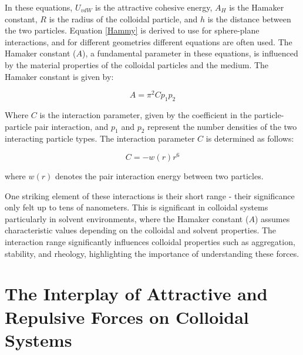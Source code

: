 

In these equations, \(U_{vdW}\) is the attractive cohesive energy, \(A_H\) is the Hamaker constant, \(R\) is the radius of the colloidal particle, and \(h\) is the distance between the two particles. Equation \ref{Hammy} is derived to use for sphere-plane interactions, and for different geometries different equations are often used. The Hamaker constant (\(A\)), a fundamental parameter in these equations, is influenced by the material properties of the colloidal particles and the medium. The Hamaker constant is given by:

\begin{equation} %
A = \pi^2 C p_1 p_2
\end{equation}


Where \(C\) is the interaction parameter, given by the coefficient in the particle-particle pair interaction, and \(p_1\) and \(p_2\) represent the number densities of the two interacting particle types. \cite{FoundColloidBook} The interaction parameter \(C\) is determined as follows:

\begin{equation}
C = -w(r) r^6
\end{equation}

where \(w(r)\) denotes the pair interaction energy between two particles. 

One striking element of these interactions is their short range - their significance only felt up to tens of nanometers. This is significant in colloidal systems particularly in solvent environments, where the Hamaker constant (\(A\)) assumes characteristic values depending on the colloidal and solvent properties. The interaction range significantly influences colloidal properties such as aggregation, stability, and rheology, highlighting the importance of understanding these forces.\cite{israelachvili2011intermolecular} %

\section{The Interplay of Attractive and Repulsive Forces on Colloidal Systems}

